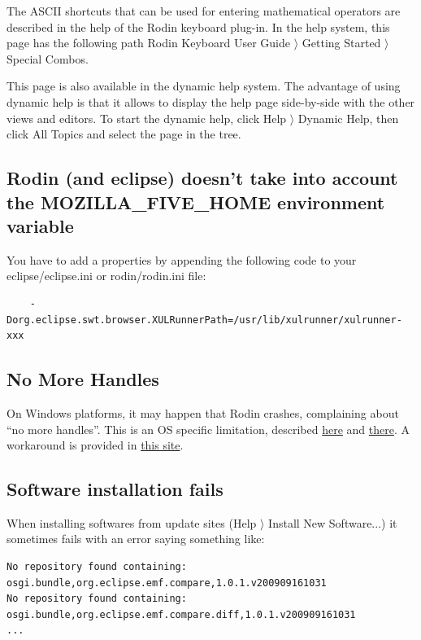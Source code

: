 The ASCII shortcuts that can be used for entering mathematical operators are described in the help of the Rodin keyboard plug-in. In the help system, this page has the following path \textsf{Rodin Keyboard User Guide $\rangle$ Getting Started $\rangle$ Special Combos}. 

This page is also available in the dynamic help system. The advantage of using dynamic help is that it allows to display the help page side-by-side with the other views and editors. To start the dynamic help, click \textsf{Help $\rangle$ Dynamic Help}, then click \textsf{All Topics} and select the page in the tree. 

\subsection{Rodin (and eclipse) doesn't take into account the MOZILLA\_FIVE\_HOME environment variable}

You have to add a properties by appending the following code to your \textsf{eclipse/eclipse.ini} or \textsf{rodin/rodin.ini} file: 

\begin{verbatim} 
	-Dorg.eclipse.swt.browser.XULRunnerPath=/usr/lib/xulrunner/xulrunner-xxx 
\end{verbatim} 

\subsection{No More Handles}

On Windows platforms, it may happen that Rodin crashes, complaining about ``no more handles''. This is an OS specific limitation, described \href{http://journals.jevon.org/users/jevon-phd/entry/19833}{here} and \href{https://bugs.eclipse.org/bugs/show_bug.cgi?id=211124}{there}. A workaround is provided in \href{http://blogs.msdn.com/b/ntdebugging/archive/2007/01/04/desktop-heap-overview.aspx}{this site}. 

\subsection{Software installation fails}

When installing softwares from update sites (\textsf{Help $\rangle$ Install New Software...}) it sometimes fails with an error saying something like: 

\begin{verbatim}
No repository found containing: osgi.bundle,org.eclipse.emf.compare,1.0.1.v200909161031
No repository found containing: osgi.bundle,org.eclipse.emf.compare.diff,1.0.1.v200909161031
...
\end{verbatim}

